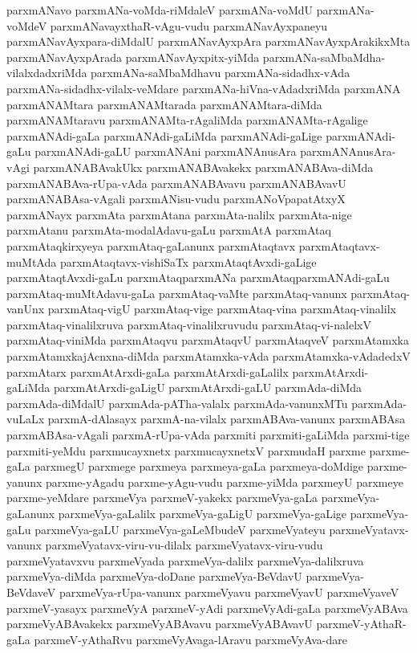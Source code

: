 {parxmANavo
parxmANa-voMda-riMdaleV
parxmANa-voMdU
parxmANa-voMdeV
parxmANavayxthaR-vAgu-vudu
parxmANavAyxpaneyu
parxmANavAyxpara-diMdalU
parxmANavAyxpAra
parxmANavAyxpArakikxMta
parxmANavAyxpArada
parxmANavAyxpitx-yiMda
parxmANa-saMbaMdha-vilalxdadxriMda
parxmANa-saMbaMdhavu
parxmANa-sidadhx-vAda
parxmANa-sidadhx-vilalx-veMdare
parxmANa-hiVna-vAdadxriMda
parxmANA
parxmANAMtara
parxmANAMtarada
parxmANAMtara-diMda
parxmANAMtaravu
parxmANAMta-rAgaliMda
parxmANAMta-rAgalige
parxmANAdi-gaLa
parxmANAdi-gaLiMda
parxmANAdi-gaLige
parxmANAdi-gaLu
parxmANAdi-gaLU
parxmANAni
parxmANAnusAra
parxmANAnusAra-vAgi
parxmANABAvakUkx
parxmANABAvakekx
parxmANABAva-diMda
parxmANABAva-rUpa-vAda
parxmANABAvavu
parxmANABAvavU
parxmANABAsa-vAgali
parxmANisu-vudu
parxmANoVpapatAtxyX
parxmANayx
parxmAta
parxmAtana
parxmAta-nalilx
parxmAta-nige
parxmAtanu
parxmAta-modalAdavu-gaLu
parxmAtA
parxmAtaq
parxmAtaqkirxyeya
parxmAtaq-gaLanunx
parxmAtaqtavx
parxmAtaqtavx-muMtAda
parxmAtaqtavx-vishiSaTx
parxmAtaqtAvxdi-gaLige
parxmAtaqtAvxdi-gaLu
parxmAtaqparxmANa
parxmAtaqparxmANAdi-gaLu
parxmAtaq-muMtAdavu-gaLa
parxmAtaq-vaMte
parxmAtaq-vanunx
parxmAtaq-vanUnx
parxmAtaq-vigU
parxmAtaq-vige
parxmAtaq-vina
parxmAtaq-vinalilx
parxmAtaq-vinalilxruva
parxmAtaq-vinalilxruvudu
parxmAtaq-vi-nalelxV
parxmAtaq-viniMda
parxmAtaqvu
parxmAtaqvU
parxmAtaqveV
parxmAtamxka
parxmAtamxkajAcnxna-diMda
parxmAtamxka-vAda
parxmAtamxka-vAdadedxV
parxmAtarx
parxmAtArxdi-gaLa
parxmAtArxdi-gaLalilx
parxmAtArxdi-gaLiMda
parxmAtArxdi-gaLigU
parxmAtArxdi-gaLU
parxmAda-diMda
parxmAda-diMdalU
parxmAda-pATha-valalx
parxmAda-vanunxMTu
parxmAda-vuLaLx
parxmA-dAlasayx
parxmA-na-vilalx
parxmABAva-vanunx
parxmABAsa
parxmABAsa-vAgali
parxmA-rUpa-vAda
parxmiti
parxmiti-gaLiMda
parxmi-tige
parxmiti-yeMdu
parxmucayxnetx
parxmucayxnetxV
parxmudaH
parxme
parxme-gaLa
parxmegU
parxmege
parxmeya
parxmeya-gaLa
parxmeya-doMdige
parxme-yanunx
parxme-yAgadu
parxme-yAgu-vudu
parxme-yiMda
parxmeyU
parxmeye
parxme-yeMdare
parxmeVya
parxmeV-yakekx
parxmeVya-gaLa
parxmeVya-gaLanunx
parxmeVya-gaLalilx
parxmeVya-gaLigU
parxmeVya-gaLige
parxmeVya-gaLu
parxmeVya-gaLU
parxmeVya-gaLeMbudeV
parxmeVyateyu
parxmeVyatavx-vanunx
parxmeVyatavx-viru-vu-dilalx
parxmeVyatavx-viru-vudu
parxmeVyatavxvu
parxmeVyada
parxmeVya-dalilx
parxmeVya-dalilxruva
parxmeVya-diMda
parxmeVya-doDane
parxmeVya-BeVdavU
parxmeVya-BeVdaveV
parxmeVya-rUpa-vanunx
parxmeVyavu
parxmeVyavU
parxmeVyaveV
parxmeV-yasayx
parxmeVyA
parxmeV-yAdi
parxmeVyAdi-gaLa
parxmeVyABAva
parxmeVyABAvakekx
parxmeVyABAvavu
parxmeVyABAvavU
parxmeV-yAthaR-gaLa
parxmeV-yAthaRvu
parxmeVyAvaga-lAravu
parxmeVyAva-dare
}
